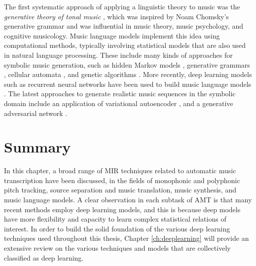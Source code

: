 The first systematic approach of applying a linguistic theory to music was the \emph{generative theory of tonal music} \cite{lerdahl1983gttm}, which was inspired by Noam Chomsky's generative grammar \cite{chomsky1966generative} and was influential in music theory, music psychology, and cognitive musicology.
Music language models implement this idea using computational methods, typically involving statistical models that are also used in natural language processing.
These include many kinds of approaches for symbolic music generation, such as hidden Markov models \cite{farbood2001markov}, generative grammars \cite{chemilier2001grammar}, cellular automata \cite{burraston2004automata}, and genetic algorithms \cite{miranda2007evolutionary}.
More recently, deep learning models such as recurrent neural networks have been used to build music language models \cite{sigtia2014lm}.
The latest approaches to generate realistic music sequences in the symbolic domain include an application of variational autoencoder \cite{teng2017generating,tikhonov2017generation}, and a generative adversarial network \cite{yang2017midinet}.

\section{Summary}

In this chapter, a broad range of MIR techniques related to automatic music transcription have been discussed, in the fields of monophonic and polyphonic pitch tracking, source separation and music translation, music synthesis, and music language models.
A clear observation in each subtask of AMT is that many recent methods employ deep learning models, and this is because deep models have more flexibility and capacity to learn complex statistical relations of interest.
In order to build the solid foundation of the various deep learning techniques used throughout this thesis, Chapter \ref{ch:deeplearning} will provide an extensive review on the various techniques and models that are collectively classified as deep learning.
